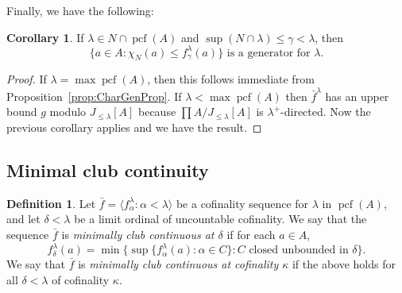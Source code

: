 \documentclass[10pt]{amsart}
\theoremstyle{plain}
\theoremstyle{definition}
\newtheorem{corollary}[proposition]{Corollary}
\newtheorem{definition}[proposition]{Definition}
\theoremstyle{remark}
\DeclareMathOperator{\pcf}{pcf}
\numberwithin{equation}{section}
\begin{document}
Finally, we have the following:

\begin{corollary}
If $\lambda\in N\cap\pcf(A)$ and $\sup(N\cap\lambda)\leq\gamma<\lambda$, then
\begin{equation}
\{a\in A: \chi_N(a)\leq f^\lambda_\gamma(a)\}\text{ is a generator for }\lambda.
\end{equation}
\end{corollary}
\begin{proof}
If $\lambda = \max\pcf(A)$, then this follows immediate from Proposition~\ref{prop:CharGenProp}. If $\lambda<\max\pcf(A)$ then
$\bar{f}^\lambda$ has an upper bound $g$ modulo $J_{\leq\lambda}[A]$ because $\prod A/ J_{\leq\lambda}[A]$ is $\lambda^+$-directed.
Now the previous corollary applies and we have the result.
\end{proof}


\subsection{Minimal club continuity}


\begin{definition}
Let $\bar{f}=\langle f^\lambda_\alpha:\alpha<\lambda\rangle$ be a cofinality sequence for $\lambda$ in $\pcf(A)$, and let $\delta<\lambda$
be a limit ordinal of uncountable cofinality.  We say that the sequence $\bar{f}$ is {\em minimally club continuous at $\delta$}
if for each $a\in A$,
\begin{equation}
\label{eqn:65.1}
f^\lambda_\delta(a) = \min\{\sup\{f^\lambda_\alpha(a): \alpha\in C\}: C\text{ closed unbounded in }\delta\}.
\end{equation}
We say that $\bar{f}$ is {\em minimally club continuous at cofinality $\kappa$} if the above holds for all $\delta<\lambda$
 of cofinality $\kappa$.
\end{definition}
\end{document}
